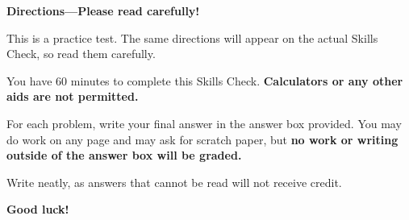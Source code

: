\documentclass{article}
\begin{document}


{\Large
\begin{center}\textbf{Directions---Please read carefully!} \end{center}}

This is a practice test. The same directions will appear on the actual Skills Check, so read them carefully.

\hrulefill 

You have 60 minutes to complete this Skills Check. \textbf{Calculators or any other aids are not permitted.}  


For each problem, write your final answer in the answer box provided. You may do work on any page and may ask for scratch paper, but \textbf{no work or writing outside of the answer box will be graded.}

Write neatly, as answers that cannot be read will not receive credit. 

   

\begin{center}\textbf{Good luck!}\end{center}


\newpage
\end{document}
